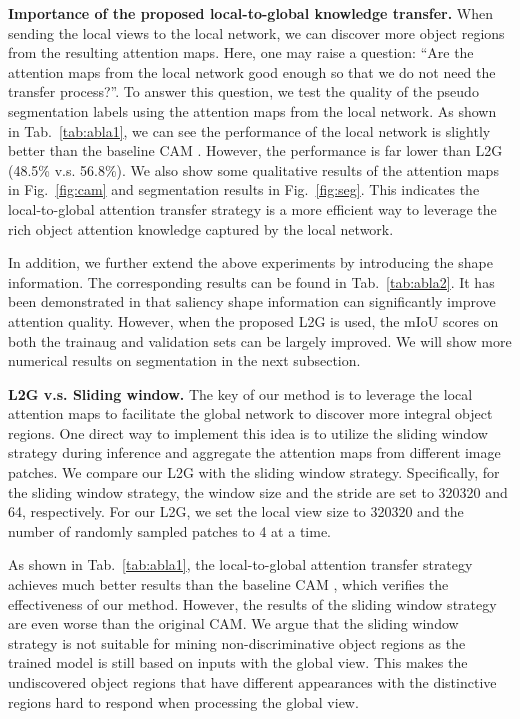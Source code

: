 \documentclass[10pt,twocolumn,letterpaper]{article}
\newcommand{\myParaP}[1]{\vspace{.05in}\noindent\textbf{#1}}
\newcommand{\figref}[1]{Fig.~\ref{#1}}
\newcommand{\tabref}[1]{Tab.~\ref{#1}}
\begin{document}
\myParaP{Importance of the proposed local-to-global knowledge transfer. }
When sending the local views to the local network, 
we can discover more object regions
from the resulting attention maps.
Here, one may raise a question: ``Are the attention maps 
from the local network good enough so that we do not need the transfer process?''.
To answer this question, we test the quality of 
the pseudo segmentation labels using the attention maps 
from the local network.
As shown in \tabref{tab:abla1}, we can see the performance of 
the local network is slightly better than the baseline CAM \cite{zhou2016learning}.
However, the performance is far lower than L2G (48.5\% v.s. 56.8\%).
We also show some qualitative  results of the attention maps 
in \figref{fig:cam} and segmentation results in \figref{fig:seg}.
This indicates the local-to-global attention transfer strategy 
is a more efficient way to leverage the rich object attention
knowledge captured by the local network.

In addition, we further extend the above experiments by
introducing the shape information.
The corresponding results can be found in \tabref{tab:abla2}.
It has been demonstrated in \cite{lee2021railroad} that
saliency shape information can significantly improve attention
quality.
However, when the proposed L2G is used, the mIoU scores on
both the trainaug and validation sets  can be
largely improved.
We will show more numerical results on segmentation in the next
subsection.



\myParaP{L2G v.s. Sliding window. } 
The key of our method is to leverage the local attention maps 
to facilitate the global network to discover more integral
object regions.
One direct way to implement this idea is to utilize 
the sliding window strategy during inference and aggregate the
attention maps from different image patches.
We compare our L2G with the sliding window strategy.
Specifically, for the sliding window strategy, the window size 
and the stride are set to 320320 and 64, respectively.
For our L2G, we set the local view size 
to 320320 and the number of randomly sampled patches
to 4 at a time.



As shown in \tabref{tab:abla1}, the local-to-global attention transfer strategy 
achieves much better results than the baseline CAM \cite{zhou2016learning}, 
which verifies the effectiveness of our method.
However, the results of the sliding window strategy are even
worse than the original CAM.
We argue that the sliding window strategy is not suitable 
for mining non-discriminative object regions as the trained model
is still based on inputs with the global view.
This makes the undiscovered object regions
that have different appearances with the distinctive 
regions hard to respond when processing the global view.
\end{document}
